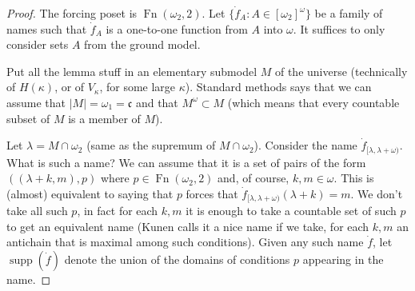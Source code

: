 \documentclass{amsart}
\theoremstyle{plain}
\theoremstyle{definition}
\theoremstyle{remark}
\theoremstyle{plain}
\theoremstyle{definition}
\theoremstyle{remark}
\begin{document}
            \begin{proof}
            The forcing poset is $\operatorname{Fn}(\omega_2, 2)$.
            Let $\{ \dot f_{A} : A\in [\omega_2]^\omega\}$ be a family of
            names such that $\dot f_{A}$ is a one-to-one function from $A$ into
            $\omega$. It suffices to only consider sets $A$ from the ground
            model.
            \bigskip

            Put all the lemma  stuff in an elementary submodel $M$ of the universe
            (technically of $H(\kappa)$,  or of $V_\kappa$,
             for some large $\kappa$). Standard methods says that we can assume that
             $|M|=\omega_1 =\mathfrak c$ and that $M^\omega\subset M$ (which means
             that every countable subset of $M$ is a member of $M$).
            \bigskip

            Let $\lambda = M\cap \omega_2$ (same as the supremum of $M\cap
            \omega_2$). Consider the name  $\dot f_{[\lambda,\lambda+\omega)}$.
            What is such a name?  We can assume that it is a set of pairs
             of the form $( (\lambda+k,m), p)$ where $p\in \mathop{Fn}(\omega_2,
             2)$ and, of course, $k,m\in \omega$. This is (almost) equivalent to
             saying
             that $p$ forces that $\dot f_{[\lambda,\lambda+\omega)}(\lambda+k) =
             m$. We don't take all such $p$, in fact for each $k,m$ it is enough
            to take a
             countable set of such $p$ to get an equivalent name
             (Kunen calls it a nice name if we take, for each $k,m$ an
            antichain that is maximal among such conditions).
            Given any such name $\dot f$, let $\operatorname{supp}(\dot f)$
            denote the union of the domains of conditions $p$ appearing in the
            name.




\end{proof}
\end{document}
